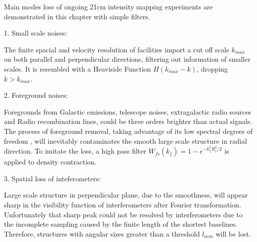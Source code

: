 Main modes loss of ongoing 21cm intensity mapping 
experiments are demonstrated in this chapter with simple filters. 

1. Small scale noises:

The finite spacial and velocity resolution of facilities 
import a cut off scale $k_{max}$ on both parallel and perpendicular 
directions, filtering out information of smaller scales. 
It is resembled with a Heaviside Function 
$H(k_{max}-k)$, dropping $k>k_{max}$. 

2. Foreground noises:

Foregrounds from Galactic emissions, telescope noises, 
extragalactic radio sources and Radio recombination lines, 
could be three orders brighter than actual signals\cite{DiMatteo04,Masui13}. 
The process of foreground removal, taking advantage of its low spectral
degrees of freedom \cite{Switzer15}, 
will inevitably contaminates the smooth large scale structure in radial direction.  
To imitate the loss, a high pass filter $W_{fs}(k_\parallel)=1-e^{-k_\parallel^2R_\parallel^2/2}$ is applied to density contraction. 

3. Spatial loss of inteferometers:

Large scale structure in perpendicular plane, due to the smoothness, 
will appear sharp in the visibility function of interferometers 
after Fourier transformation. 
Unfortunately that sharp peak could not be resolved by interferometers 
due to the incomplete sampling  
caused by the finite length of the shortest baselines. 
Therefore, structures with angular sizes greater than a threshold $l_{min}$ 
will be lost. 

